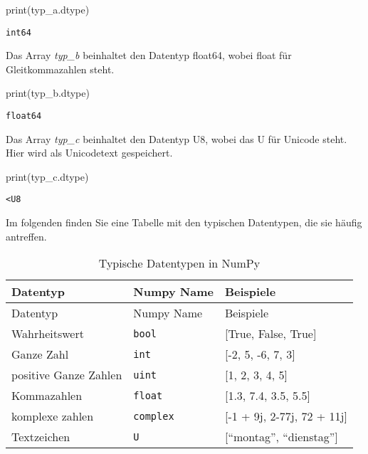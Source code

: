 \documentclass[
  letterpaper,
  DIV=11,
  numbers=noendperiod]{scrreprt}
\newenvironment{Shaded}{\begin{snugshade}}{\end{snugshade}}
\newcommand{\BuiltInTok}[1]{\textcolor[rgb]{0.00,0.23,0.31}{#1}}
\newcommand{\NormalTok}[1]{\textcolor[rgb]{0.00,0.23,0.31}{#1}}
\begin{document}
\begin{tcolorbox}
\begin{Shaded}
\begin{Highlighting}[]
\BuiltInTok{print}\NormalTok{(typ\_a.dtype)}
\end{Highlighting}
\end{Shaded}

\begin{verbatim}
int64
\end{verbatim}

Das Array \emph{typ\_b} beinhaltet den Datentyp float64, wobei float für
Gleitkommazahlen steht.

\begin{Shaded}
\begin{Highlighting}[]
\BuiltInTok{print}\NormalTok{(typ\_b.dtype)}
\end{Highlighting}
\end{Shaded}

\begin{verbatim}
float64
\end{verbatim}

Das Array \emph{typ\_c} beinhaltet den Datentyp U8, wobei das U für
Unicode steht. Hier wird als Unicodetext gespeichert.

\begin{Shaded}
\begin{Highlighting}[]
\BuiltInTok{print}\NormalTok{(typ\_c.dtype)}
\end{Highlighting}
\end{Shaded}

\begin{verbatim}
<U8
\end{verbatim}

Im folgenden finden Sie eine Tabelle mit den typischen Datentypen, die
sie häufig antreffen.

\begin{longtable}[]{@{}lll@{}}
\caption{Typische Datentypen in
NumPy}\label{tbl-datatypes}\tabularnewline
\toprule\noalign{}
Datentyp & Numpy Name & Beispiele \\
\midrule\noalign{}
\endfirsthead
\toprule\noalign{}
Datentyp & Numpy Name & Beispiele \\
\midrule\noalign{}
\endhead
\bottomrule\noalign{}
\endlastfoot
Wahrheitswert & \texttt{bool} & {[}True, False, True{]} \\
Ganze Zahl & \texttt{int} & {[}-2, 5, -6, 7, 3{]} \\
positive Ganze Zahlen & \texttt{uint} & {[}1, 2, 3, 4, 5{]} \\
Kommazahlen & \texttt{float} & {[}1.3, 7.4, 3.5, 5.5{]} \\
komplexe zahlen & \texttt{complex} & {[}-1 + 9j, 2-77j, 72 + 11j{]} \\
Textzeichen & \texttt{U} & {[}``montag'', ``dienstag''{]} \\
\end{longtable}


\end{tcolorbox}
\end{document}
